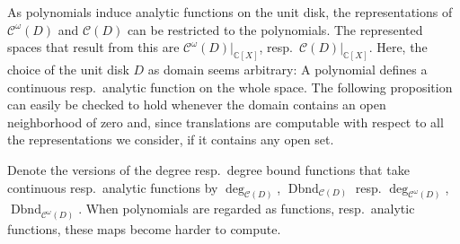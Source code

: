 \documentclass{eptcs-modified}
\newcommand{\CC}{\mathbb{C}}
\newcommand{\analytic}{\mathcal C^\omega(D)}
\newcommand{\cont}{\mathcal C(D)}
\newcommand{\dbnd}{\operatorname{Dbnd}}
\begin{document}
			As polynomials induce analytic functions on the unit disk, the representations of $\analytic$ and $\cont$ can be restricted to the polynomials.
			The represented spaces that result from this are $\analytic|_{\CC[X]}$, resp.\ $\cont|_{\CC[X]}$.
			Here, the choice of the unit disk $D$ as domain seems arbitrary: A polynomial defines a continuous resp.\ analytic function on the whole space.
			The following proposition can easily be checked to hold whenever the domain contains an open neighborhood of zero and, since translations are computable with respect to all the representations we consider, if it contains any open set.

			Denote the versions of the degree resp.\ degree bound functions that take continuous resp.\ analytic functions by $\deg_{\cont}$, $\dbnd_{\cont}$ resp. $\deg_{\analytic}$, $\dbnd_{\analytic}$.
			When polynomials are regarded as functions, resp.\ analytic functions, these maps become harder to compute.
\end{document}
